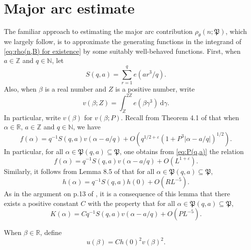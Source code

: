 \documentclass[12pt,english,reqno]{amsart}
\theoremstyle{definition}
\theoremstyle{remark}
\numberwithin{equation}{section}
\numberwithin{equation}{section}
\numberwithin{figure}{section}
\theoremstyle{plain}
\theoremstyle{plain}
\theoremstyle{plain}
\theoremstyle{plain}
\numberwithin{equation}{section}
\numberwithin{thm}{section}
\begin{document}
\section{Major arc estimate}
The familiar approach to estimating the major arc contribution $\rho_{\theta}(n;\mathfrak{P})$,
which we largely follow, is to approximate the generating functions
in the integrand of \eqref{eq:rho(n,B) for existence} by some suitably
well-behaved functions. First, when $a\in\mathbb{Z}$ and $q\in\mathbb{N}$,
let
\begin{equation}
S(q,a)=\sum_{r=1}^{q}e(ar^3/q).\label{eq:S(q,a)}\end{equation}
Also, when $\beta$ is a real number and $Z$ is a positive number, write
\begin{equation}
v(\beta;Z)=\int_{Z}^{2Z}e(\beta\gamma^{3})\:\mathrm{d}\gamma.\label{eq:v(beta)}\end{equation}
In particular, write $v(\beta)$ for $v(\beta;P)$. Recall from Theorem 4.1 of \cite{vaughan1997} that when $\alpha\in\mathbb{R}$,
$a\in\mathbb{Z}$ and $q\in\mathbb{N}$, we have
\begin{equation}
f(\alpha)=q^{-1}S(q,a)v(\alpha-a/q)+O(q^{1/2+\varepsilon}(1+P^{3}|\alpha-a/q|)^{1/2}).\label{eq:approx. for f in general}\end{equation}
In particular, for all $\alpha\in\mathfrak{P}(q,a)\subseteq\mathfrak{P}$,
one obtains from \eqref{eq:P(q,a)} the relation
\begin{equation}
f(\alpha)=q^{-1}S(q,a)v(\alpha-a/q)+O(L^{1+\varepsilon}).\label{eq:approx for f on P(q,a)}\end{equation}
Similarly, it follows from Lemma 8.5 of \cite{wooley1991} that for
all $\alpha\in\mathfrak{P}(q,a)\subseteq\mathfrak{P}$, 
\begin{equation}
h(\alpha)=q^{-1}S(q,a)h(0)+O(RL^{-5}).\label{eq:approx for h on P(q,a)}\end{equation}
As in the argument on p.13 of \cite{BrudernWooley2009}, it is a consequence
of this lemma that there exists a positive constant $C$ with the
property that for all $\alpha\in\mathfrak{P}(q,a)\subseteq\mathfrak{P}$,
\begin{equation}
K(\alpha)=Cq^{-1}S(q,a)v(\alpha-a/q)+O(PL^{-5}).\label{eq:approx for K on P(q,a)}\end{equation}
\par When $\beta\in\mathbb{R}$, define
\begin{equation}
u(\beta)=Ch(0)^{2}v(\beta)^{2}.\label{eq:u(beta)}\end{equation}
\end{document}
